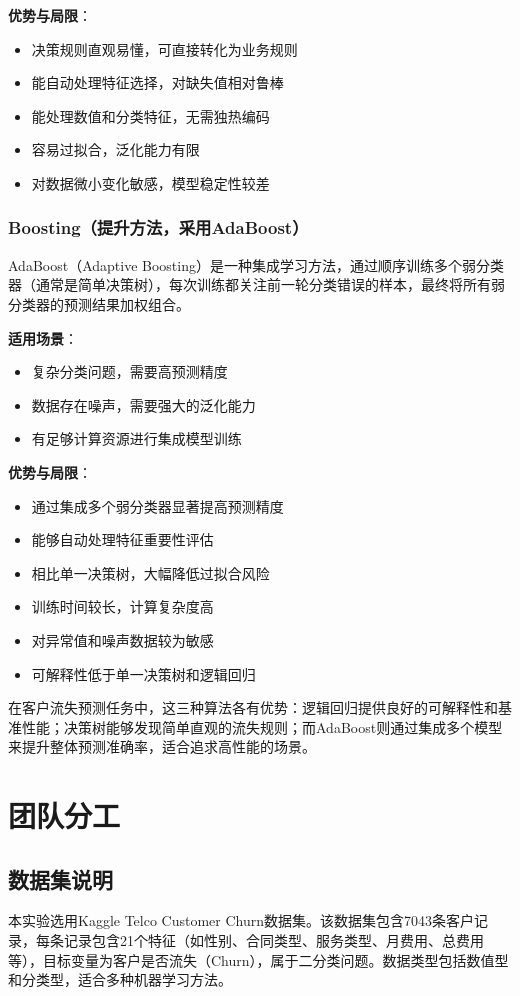\documentclass[12pt,a4paper]{article}
\begin{document}
\textbf{优势与局限}：
\begin{itemize}
    \item 决策规则直观易懂，可直接转化为业务规则
    \item 能自动处理特征选择，对缺失值相对鲁棒
    \item 能处理数值和分类特征，无需独热编码
    \item 容易过拟合，泛化能力有限
    \item 对数据微小变化敏感，模型稳定性较差
\end{itemize}

\subsubsection{Boosting（提升方法，采用AdaBoost）}
AdaBoost（Adaptive Boosting）是一种集成学习方法，通过顺序训练多个弱分类器（通常是简单决策树），每次训练都关注前一轮分类错误的样本，最终将所有弱分类器的预测结果加权组合。

\textbf{适用场景}：
\begin{itemize}
    \item 复杂分类问题，需要高预测精度
    \item 数据存在噪声，需要强大的泛化能力
    \item 有足够计算资源进行集成模型训练
\end{itemize}

\textbf{优势与局限}：
\begin{itemize}
    \item 通过集成多个弱分类器显著提高预测精度
    \item 能够自动处理特征重要性评估
    \item 相比单一决策树，大幅降低过拟合风险
    \item 训练时间较长，计算复杂度高
    \item 对异常值和噪声数据较为敏感
    \item 可解释性低于单一决策树和逻辑回归
\end{itemize}

在客户流失预测任务中，这三种算法各有优势：逻辑回归提供良好的可解释性和基准性能；决策树能够发现简单直观的流失规则；而AdaBoost则通过集成多个模型来提升整体预测准确率，适合追求高性能的场景。

\section{团队分工}

\subsection{数据集说明}
本实验选用Kaggle Telco Customer Churn数据集。该数据集包含7043条客户记录，每条记录包含21个特征（如性别、合同类型、服务类型、月费用、总费用等），目标变量为客户是否流失（Churn），属于二分类问题。数据类型包括数值型和分类型，适合多种机器学习方法。
\end{document}
